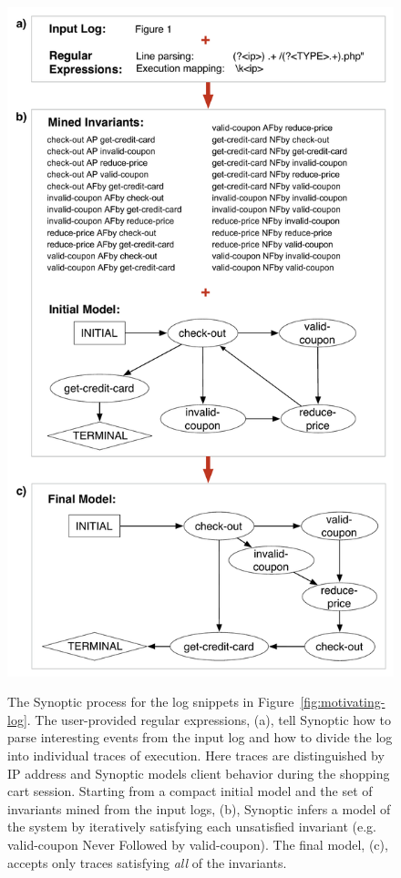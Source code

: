 \begin{figure}
   \center
   {\includegraphics[width=0.95\columnwidth]{fig/shopping_cart.pdf}}
   \smallskip
   \caption{The Synoptic process for the log snippets in
   Figure~\ref{fig:motivating-log}. The user-provided regular expressions, (a),
   tell Synoptic how to parse interesting events from the input log and how to divide the log into
   individual traces of execution. Here traces are distinguished by IP address
   and Synoptic models client behavior during the shopping cart session.
   Starting from
   a compact initial model and the set of invariants mined from the input logs, (b), Synoptic 
   infers a model of the system by iteratively satisfying each unsatisfied
   invariant (e.g. valid-coupon Never Followed by valid-coupon).
   The final model, (c), accepts only traces satisfying \emph{all} of the
   invariants.}
   \label{fig:synop_shop}
\end{figure}
